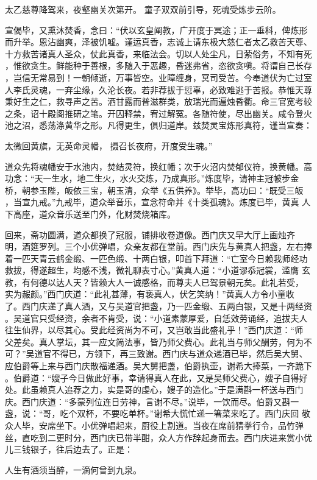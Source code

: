 太乙慈尊降驾来，夜壑幽关次第开。
童子双双前引导，死魂受炼步云阶。

宣偈毕，又熏沐焚香，念曰：“伏以玄皇阐教，广开度于冥途；正一垂科，俾炼形
而升举。恩沾幽爽，泽被饥嘘。谨运真香，志诚上请东极大慈仁者太乙救苦天尊、
十方救苦诸真人圣众，仗此真香，来临法会。切以人处尘凡，日萦俗务，不知有死
，惟欲贪生。鲜能种于善根，多随入于恶趣，昏迷弗省，恣欲贪嗔。将谓自己长存
，岂信无常易到！一朝倾逝，万事皆空。业障缠身，冥司受苦。今奉道伏为亡过室
人李氏灵魂，一弃尘缘，久沦长夜。若非荐拔于愆辜，必致难逃于苦报。恭惟天尊
秉好生之仁，救寻声之苦。洒甘露而普滋群类，放瑞光而遍烛昏衢。命三官宽考较
之条，诏十殿阁推研之笔。开囚释禁，宥过解冤。各随符使，尽出幽关。咸令登火
池之沼，悉荡涤黄华之形。凡得更生，俱归道岸。兹焚灵宝炼形真符，谨当宣奏：

太微回黄旗，无英命灵幡，
摄召长夜府，开度受生魂。”

道众先将魂幡安于水池内，焚结灵符，换红幡；次于火沼内焚郁仪符，换黄幡。高
功念：“天一生水，地二生火，水火交炼，乃成真形。”炼度毕，请神主冠帔步金
桥，朝参玉陛，皈依三宝，朝玉清，众举《五供养》。举毕，高功曰：“既受三皈
，当宣九戒。”九戒毕，道众举音乐，宣念符命并《十类孤魂》。炼度已毕，黄真
人下高座，道众音乐送至门外，化财焚烧箱库。

回来，斋功圆满，道众都换了冠服，铺排收卷道像。西门庆又早大厅上画烛齐
明，酒筵罗列。三个小优弹唱，众亲友都在堂前。西门庆先与黄真人把盏，左右捧
着一匹天青云鹤金缎、一匹色缎、十两白银，叩首下拜道：“亡室今日赖我师经功
救拔，得遂超生，均感不浅，微礼聊表寸心。”黄真人道：“小道谬忝冠裳，滥膺
玄教，有何德以达人天？皆赖大人一诚感格，而尊夫人已驾景朝元矣。此礼若受，
实为赧颜。”西门庆道：“此礼甚薄，有亵真人，伏乞笑纳！”黄真人方令小童收
了。西门庆递了真人酒，又与吴道官把盏，乃一匹金缎、五两白银，又是十两经资
。吴道官只受经资，余者不肯受，说：“小道素蒙厚爱，自恁效劳诵经，追拔夫人
往生仙界，以尽其心。受此经资尚为不可，又岂敢当此盛礼乎！”西门庆道：“师
父差矣。真人掌坛，其一应文简法事，皆乃师父费心。此礼当与师父酬劳，何为不
可？”吴道官不得已，方领下，再三致谢。西门庆与道众递酒已毕，然后吴大舅、
应伯爵等上来与西门庆散福递酒。吴大舅把盏，伯爵执壶，谢希大捧菜，一齐跪下
。伯爵道：“嫂子今日做此好事，幸请得真人在此，又是吴师父费心，嫂子自得好
处。此虽赖真人追荐之力，实是哥的虔心，嫂子的造化。”于是满斟一杯送与西门
庆。西门庆道：“多蒙列位连日劳神，言谢不尽。”说毕，一饮而尽。伯爵又斟一
盏，说：“哥，吃个双杯，不要吃单杯。”谢希大慌忙递一箸菜来吃了。西门庆回
敬众人毕，安席坐下。小优弹唱起来，厨役上割道。当夜在席前猜拳行令，品竹弹
丝，直吃到二更时分，西门庆已带半酣，众人方作辞起身而去。西门庆进来赏小优
儿三钱银子，往后边去了。正是：

人生有酒须当醉，一滴何曾到九泉。